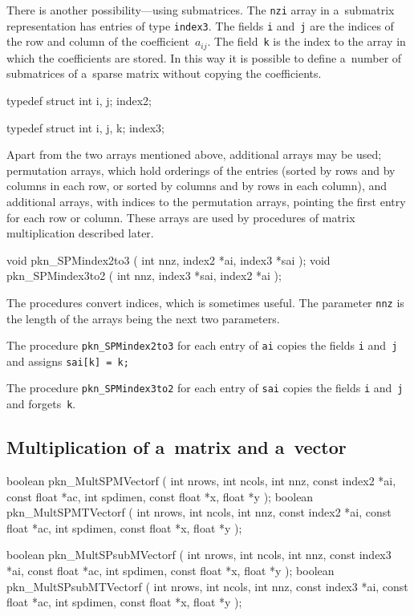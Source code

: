 There is another possibility---using submatrices. The \texttt{nzi} array in
a~submatrix representation has entries of type \texttt{index3}. The fields
\texttt{i} and~\texttt{j} are the indices of the row and column of the
coefficient~$a_{ij}$. The field~\texttt{k} is the index to the array in
which the coefficients are stored. In this way it is possible to define
a~number of submatrices of a~sparse matrix without copying the coefficients.

\medskip
\begin{listingC}
typedef struct {
    int i, j;
  } index2;

typedef struct {
    int i, j, k;
  } index3;
\end{listingC}

Apart from the two arrays mentioned above, additional arrays may be used;
permutation arrays, which hold orderings of the entries (sorted by rows
and by columns in each row, or sorted by columns and by rows in each
column), and additional arrays, with indices to the permutation arrays,
pointing the first entry for each row or column. These arrays are used by
procedures of matrix multiplication described later.

\begin{listingC}
void pkn_SPMindex2to3 ( int nnz, index2 *ai, index3 *sai );
void pkn_SPMindex3to2 ( int nnz, index3 *sai, index2 *ai );
\end{listingC}
The procedures convert indices, which is sometimes useful. The parameter
\texttt{nnz} is the length of the arrays being the next two parameters.

The procedure \texttt{pkn\_SPMindex2to3} for each entry of \texttt{ai} copies
the fields \texttt{i} and~\texttt{j} and assigns \texttt{sai[k] = k;}

The procedure \texttt{pkn\_SPMindex3to2} for each entry of \texttt{sai}
copies the fields \texttt{i} and~\texttt{j} and forgets~\texttt{k}.


\subsection{Multiplication of a~matrix and a~vector}

\begin{listingC}
boolean pkn_MultSPMVectorf ( int nrows, int ncols, int nnz,
                             const index2 *ai, const float *ac,    
                             int spdimen, const float *x,
                             float *y );
boolean pkn_MultSPMTVectorf ( int nrows, int ncols, int nnz,
                              const index2 *ai, const float *ac,
                              int spdimen, const float *x,
                              float *y );

boolean pkn_MultSPsubMVectorf ( int nrows, int ncols, int nnz,
                                const index3 *ai, const float *ac,
                                int spdimen, const float *x, 
                                float *y );
boolean pkn_MultSPsubMTVectorf ( int nrows, int ncols, int nnz,
                                 const index3 *ai, const float *ac,
                                 int spdimen, const float *x,
                                 float *y );
\end{listingC}

